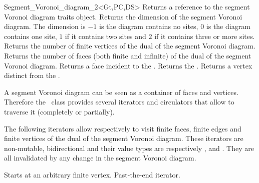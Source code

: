 \begin{ccRefClass}{Segment_Voronoi_diagram_2<Gt,PC,DS>}
\ccAccessFunctions
%
{Returns a reference to the segment Voronoi diagram traits object.}
\ccGlue
{}
{Returns the dimension of the segment Voronoi diagram. The dimension
  is $-1$ is the diagram contains no sites, $0$ is the diagram
  contains one site, $1$ if it contains two sites and $2$ if it
  contains three or more sites.}
\ccGlue
{}
{Returns the number of finite vertices of the dual of the segment
  Voronoi diagram.}
\ccGlue
{}
{Returns the number of faces (both finite and infinite) of the
  dual of the segment Voronoi diagram.}
\ccGlue
{}
{Returns a face incident to the .}
\ccGlue
{}
{Returns the .}
\ccGlue
{}
{Returns a vertex distinct from  the .
}
\ccGlue
{}
\ccGlue
{}




A segment Voronoi diagram can be seen as a container of faces and
vertices. Therefore the \ccRefName\ class provides several iterators
and circulators that allow to traverse it (completely or partially).





The following iterators allow respectively to visit 
finite faces,  finite edges and  finite vertices of the dual of the
segment Voronoi diagram. These iterators are non-mutable,
bidirectional and their value types are respectively
,  and . 
They are all invalidated by any change in the segment Voronoi diagram.

{Starts at an arbitrary finite vertex.}
\ccGlue
{}
{Past-the-end iterator.}


\end{ccRefClass}
